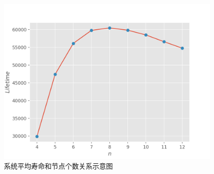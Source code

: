 \documentclass[10.5pt,twocolumn]{jbuaa}
\begin{document}
\begin{figure}[H]
	\centering
	\includegraphics[scale = 0.6]{fig5}
	\caption{系统平均寿命和节点个数关系示意图}
	\label{fig:5}
\end{figure}
\end{document}
